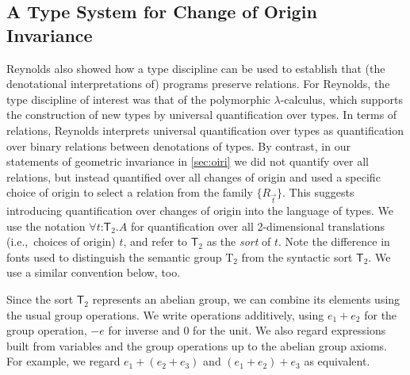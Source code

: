 \documentclass{sigplanconf}
\newcommand{\Transl}[1]{\mathrm{T}_#1}
\newcommand{\SynTransl}[1]{\mathsf{T}_#1}
\theoremstyle{examplestyle}
\theoremstyle{restatementstyle}
\begin{document}

\subsection{A Type System for Change of Origin Invariance}
\label{sec:type-system-geom-intro}

Reynolds also showed how a type discipline can be used to establish
that (the denotational interpretations of) programs preserve
relations. For Reynolds, the type discipline of interest was that of
the polymorphic $\lambda$-calculus, which supports the construction of
new types by universal quantification over types.
In terms of relations, Reynolds interprets universal quantification
over types as quantification over binary relations between denotations
of types. By contrast, in our statements of geometric invariance in
\autoref{sec:oiri} we did not quantify over all
relations, but instead quantified over all changes of origin and used
a specific choice of origin to select a relation from the family
$\{R_{\vec{t}}\}$. This suggests introducing quantification over
changes of origin into the language of types. We use the notation
$\forall t \mathord: \SynTransl{2}. A$ for quantification over all
2-dimensional translations (i.e.,~choices of origin) $t$, and refer to
$\SynTransl{2}$ as the \emph{sort} of $t$. Note the difference in
fonts used to distinguish the semantic group $\Transl{2}$ from the
syntactic sort $\SynTransl{2}$. We use a similar convention
below, too.

Since the sort $\SynTransl{2}$ represents an abelian group, we can
combine its elements using the usual group operations. We write
operations additively, using $e_1 + e_2$ for the group operation, $-e$
for inverse and $0$ for the unit.  We also regard expressions built
from variables and the group operations up to the abelian group
axioms. For example, we regard $e_1 + (e_2 + e_3)$ and $(e_1 + e_2) +
e_3$ as equivalent.
\end{document}
